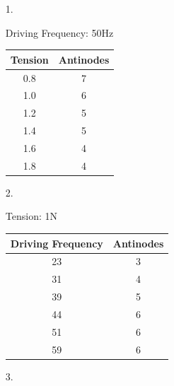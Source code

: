 \documentclass[12pt, letterpaper]{article}
\begin{document}
    \begin{itemize}
        \item [1.]\mbox{}
        
        \begin{center}
            Driving Frequency: 50Hz
    
            \begin{tabular}{| c | c |}
                \hline
                Tension & Antinodes             \\
                \hline
                0.8&7\\
                \hline
                1.0&6\\
                \hline
                1.2&5\\
                \hline
                1.4&5\\
                \hline
                1.6&4\\
                \hline
                1.8&4\\
                \hline
            \end{tabular}        
        \end{center}

        \item [2.]\mbox{}
        
        \begin{center}
            Tension: 1N
    
            \begin{tabular}{| c | c |}
                \hline
                Driving Frequency & Antinodes   \\
                \hline
                23&3\\
                \hline
                31&4\\
                \hline
                39&5\\
                \hline
                44&6\\
                \hline
                51&6\\
                \hline
                59&6\\
                \hline
            \end{tabular}        
        \end{center}

        \item [3.]
        

\end{itemize}
\end{document}
